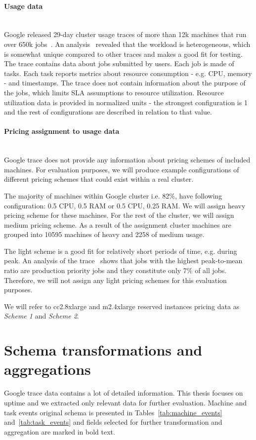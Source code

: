 \documentclass[]{final_report}
\newcommand{\myparagraph}[1]{\paragraph{#1}\mbox{}\\}
\begin{document}
\myparagraph{Usage data}

Google released 29-day cluster usage traces of more than 12k machines that run over 650k jobs~\cite{clusterdata:Reiss2011}. An analysis~\cite{clusterdata:Reiss2012b} revealed that the workload is heterogeneous, which is somewhat unique compared to other traces and makes a good fit for testing.
The trace contains data about jobs submitted by users. Each job is made of tasks. Each task reports metrics about resource consumption - e.g. CPU, memory - and timestamps. The trace does not contain information about the purpose of the jobs, which limits SLA assumptions to resource utilization. 
Resource utilization data is provided in normalized units - the strongest configuration is 1 and the rest of configurations are described in relation to that value.

\myparagraph{Pricing assignment to usage data}

Google trace does not provide any information about pricing schemes of included machines. For evaluation purposes, we will produce example configurations of different pricing schemes that could exist within a real cluster. 

The majority of machines within Google cluster i.e. 82\%, have following configuration: 0.5 CPU, 0.5 RAM or 0.5 CPU, 0.25 RAM. We will assign heavy pricing scheme for these machines. For the rest of the cluster, we will assign medium pricing scheme. 
As a result of the assignment cluster machines are grouped into 10595 machines of heavy and 2258 of medium usage.

The light scheme is a good fit for relatively short periods of time, e.g. during peak. An analysis of the trace~\cite{clusterdata:Reiss2012b} shows that jobs with the highest peak-to-mean ratio are production priority jobs and they constitute only 7\% of all jobs. Therefore, we will not assign any light pricing schemes for this evaluation purposes. 

We will refer to cc2.8xlarge and m2.4xlarge reserved instances pricing data as \textit{Scheme 1} and \textit{Scheme 2}.  
 

\section{Schema transformations and aggregations}

Google trace data contains a lot of detailed information. This thesis focuses on uptime and we extracted only relevant data for further evaluation. Machine and task events original schema is presented in Tables~\ref{tab:machine_events} and~\ref{tab:task_events} and fields selected for further transformation and aggregation are marked in bold text. 
\end{document}
